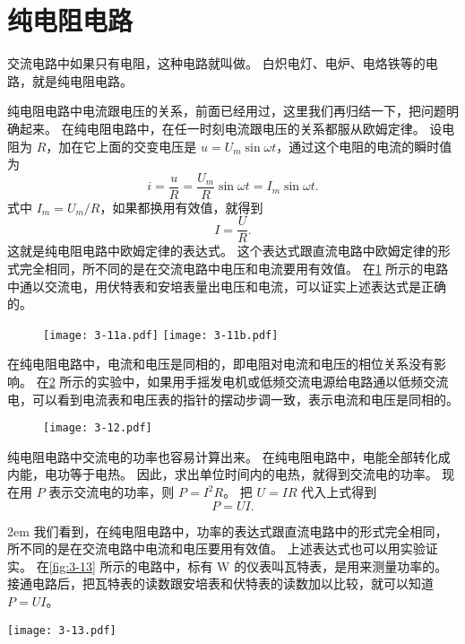 \section{纯电阻电路}
交流电路中如果只有电阻，这种电路就叫做。
白炽电灯、电炉、电烙铁等的电路，就是纯电阻电路。

纯电阻电路中电流跟电压的关系，前面已经用过，这里我们再归结一下，把问题明确起来。
在纯电阻电路中，在任一时刻电流跟电压的关系都服从欧姆定律。
设电阻为 $R$，加在它上面的交变电压是 $u=U_m\sin \omega t$，通过这个电阻的电流的瞬时值为
\[i=\frac{u}{R}=\frac{U_m}{R}\sin\omega t=I_m\sin\omega t.\]
式中 $I_m=U_m/R$，如果都换用有效值，就得到
\begin{equation}
  \label{eq:pure_R_I}
  I=\frac{U}{R}.
\end{equation}
这就是纯电阻电路中欧姆定律的表达式。
这个表达式跟直流电路中欧姆定律的形式完全相同，所不同的是在交流电路中电压和电流要用有效值。
在\cref{fig:3-11} 所示的电路中通以交流电，用伏特表和安培表量出电压和电流，可以证实上述表达式是正确的。
\begin{figure}
  \texttt{[image: 3-11a.pdf]}\qquad\qquad 
  \texttt{[image: 3-11b.pdf]}
\caption{}\label{fig:3-11}
\end{figure}

在纯电阻电路中，电流和电压是同相的，即电阻对电流和电压的相位关系没有影响。
在\cref{fig:3-12} 所示的实验中，如果用手摇发电机或低频交流电源给电路通以低频交流电，可以看到电流表和电压表的指针的摆动步调一致，表示电流和电压是同相的。
\begin{figure}
\texttt{[image: 3-12.pdf]}
\caption{}\label{fig:3-12}
\end{figure}

纯电阻电路中交流电的功率也容易计算出来。
在纯电阻电路中，电能全部转化成内能，电功等于电热。
因此，求出单位时间内的电热，就得到交流电的功率。
现在用 $P$ 表示交流电的功率，则 $P=I^2R$。
把 $U=IR$ 代入上式得到
\begin{equation}
  \label{eq:pure_R_P}
  P=UI.
\end{equation}

\medskip\noindent
\begin{minipage}{0.65\linewidth}\parindent2em
我们看到，在纯电阻电路中，功率的表达式跟直流电路中的形式完全相同，所不同的是在交流电路中电流和电压要用有效值。
上述表达式也可以用实验证实。
在\cref{fig:3-13} 所示的电路中，标有 W 的仪表叫瓦特表，是用来测量功率的。
接通电路后，把瓦特表的读数跟安培表和伏特表的读数加以比较，就可以知道 $P=UI$。
\end{minipage}\hfill
\begin{minipage}{0.35\linewidth}\centering
\begin{figurehere}
  \texttt{[image: 3-13.pdf]}
  \caption{}\label{fig:3-13}
\end{figurehere}
\end{minipage}

